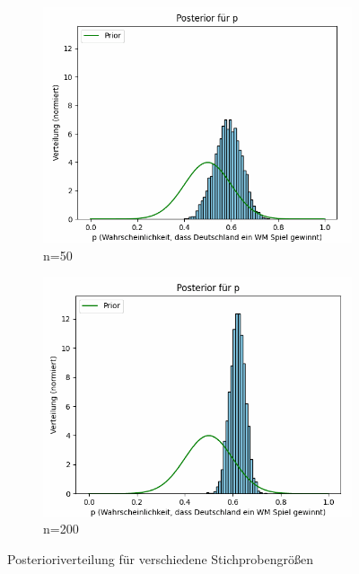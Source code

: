 \documentclass[a4paper,12pt]{article}
\begin{document}
\begin{figure}[h]
  \vspace{0.5cm}
  
  \begin{subfigure}[b]{0.45\textwidth}
      \includegraphics[width=\textwidth]{../images/framesAnimatedSampleSize/frame3.png}
      \caption{n=50}
      \label{fig:bild3}
  \end{subfigure}
  \hfill
  \begin{subfigure}[b]{0.45\textwidth}
      \includegraphics[width=\textwidth]{../images/framesAnimatedSampleSize/frame4.png}
      \caption{n=200}
      \label{fig:bild4}
  \end{subfigure}
  
  \caption{Posterioriverteilung für verschiedene Stichprobengrößen}
  \label{fig:mainfig}
\end{figure}
\end{document}
